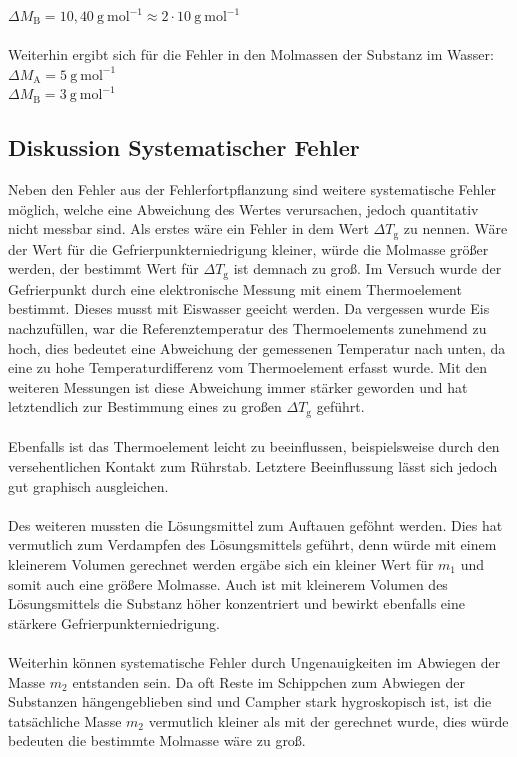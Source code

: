 \documentclass[12pt,a4paper,titlepage,headinclude,bibtotoc]{scrartcl}
\begin{document}
$\Delta M_\mathrm{B} = 10,40{~}\mathrm{g{~}mol^{-1}} \approx 2 \cdot 10 {~}\mathrm{g{~}mol^{-1}}$\\\\

Weiterhin ergibt sich für die Fehler in den Molmassen der Substanz im Wasser:\\
$\Delta M_\mathrm{A} = 5  {~}\mathrm{g{~}mol^{-1}} $\\
$\Delta M_\mathrm{B} = 3 {~}\mathrm{g{~}mol^{-1}}$\\

\subsection{Diskussion Systematischer Fehler}
Neben den Fehler aus der Fehlerfortpflanzung sind weitere systematische Fehler möglich, welche eine Abweichung des Wertes verursachen, jedoch quantitativ nicht messbar sind. 
Als erstes wäre ein Fehler in dem Wert $\Delta T_\mathrm{g}$ zu nennen. Wäre der Wert für die Gefrierpunkterniedrigung kleiner, würde die Molmasse größer werden, der bestimmt Wert für $\Delta T_\mathrm{g}$ ist demnach zu groß. Im Versuch wurde der Gefrierpunkt durch eine elektronische Messung mit einem Thermoelement bestimmt. Dieses musst mit Eiswasser geeicht werden. Da vergessen wurde Eis nachzufüllen, war die Referenztemperatur des Thermoelements zunehmend zu hoch, dies bedeutet eine Abweichung der gemessenen Temperatur nach unten, da eine zu hohe Temperaturdifferenz vom Thermoelement erfasst wurde.  Mit den weiteren Messungen ist diese Abweichung immer stärker geworden und  hat letztendlich zur Bestimmung eines zu großen $\Delta T_\mathrm{g}$ geführt.\\\\ 
Ebenfalls ist das Thermoelement leicht zu beeinflussen, beispielsweise durch den versehentlichen Kontakt zum Rührstab. Letztere Beeinflussung lässt sich jedoch gut graphisch ausgleichen.\\\\
Des weiteren mussten die Lösungsmittel zum Auftauen geföhnt werden. Dies hat vermutlich zum Verdampfen des Lösungsmittels geführt, denn würde mit einem kleinerem Volumen gerechnet werden ergäbe sich ein kleiner Wert für $m_1$ und somit auch eine größere Molmasse. Auch ist mit kleinerem Volumen des Lösungsmittels die Substanz höher konzentriert und bewirkt ebenfalls eine stärkere Gefrierpunkterniedrigung.\\\\
Weiterhin können systematische Fehler durch Ungenauigkeiten im Abwiegen der Masse $m_2$ entstanden sein. Da oft Reste im Schippchen zum Abwiegen der Substanzen hängengeblieben sind und Campher stark hygroskopisch ist, ist die tatsächliche Masse $m_2$ vermutlich kleiner als mit der gerechnet wurde, dies würde bedeuten die bestimmte Molmasse wäre zu groß.\\\\
\end{document}
